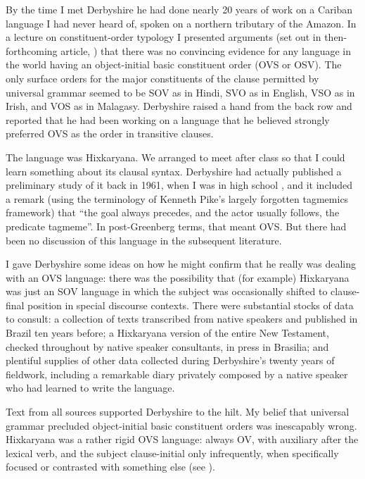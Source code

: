 \documentclass[output=paper,colorlinks,citecolor=brown
]{langscibook}
\begin{document}
By the time I met Derbyshire he had done nearly 20 years of work on
a Cariban language I had never heard of, spoken on a northern tributary
of the Amazon. In a lecture on constituent-order typology I presented
arguments (set out in then-forthcoming article, \citet{Pullum77})
that there was no convincing evidence for any language in the world
having an object-initial basic constituent order (OVS or OSV). The
only surface orders for the major constituents of the clause permitted
by universal grammar seemed to be SOV as in Hindi, SVO as in English,
VSO as in Irish, and VOS as in Malagasy. Derbyshire raised a hand
from the back row and reported that he had been working on a language
that he believed strongly preferred OVS as the order in transitive
clauses.

The language was Hixkaryana. We arranged to meet after class so that
I could learn something about its clausal syntax. Derbyshire had actually
published a preliminary study of it back in 1961, when I was in high
school \citep{Derbyshire61}, and it included a remark (using the
terminology of Kenneth Pike's largely forgotten tagmemics framework)
that ``the goal always precedes, and the actor usually follows, the
predicate tagmeme''. In post-Greenberg terms, that meant OVS. But
there had been no discussion of this language in the subsequent
literature.

I gave Derbyshire some ideas on how he might confirm that he really
was dealing with an OVS language: there was the possibility that
(for example) Hixkaryana was just an SOV language in which the subject
was occasionally shifted to clause-final position in special discourse
contexts. There were substantial stocks of data to consult: a
collection of texts transcribed from native speakers and published
in Brazil ten years before; a Hixkaryana version of the entire New
Testament, checked throughout by native speaker consultants, in press
in Brasilia; and plentiful supplies of other data collected during
Derbyshire's twenty years of fieldwork, including a remarkable diary
privately composed by a native speaker who had learned to write the
language.

Text from all sources supported Derbyshire to the hilt. My belief
that universal grammar precluded object-initial basic constituent
orders was inescapably wrong. Hixkaryana was a rather rigid OVS
language: always OV, with auxiliary after the lexical verb, and
the subject clause-initial only infrequently, when specifically
focused or contrasted with something else (see
\citealt[74]{Derbyshire85}).
\end{document}
